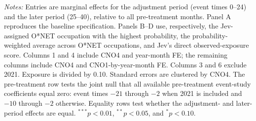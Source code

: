 \begin{table}[H]
\begin{threeparttable}
\begin{minipage}{0.92\textwidth}
\emph{Notes:} Entries are marginal effects for the adjustment period (event times 0--24) and the later period (25--40), relative to all pre-treatment months. Panel A reproduces the baseline specification. Panels B--D use, respectively, the Jev-assigned O*NET occupation with the highest probability, the probability-weighted average across O*NET occupations, and Jev's direct observed-exposure score. Columns 1 and 4 include CNO4 and year-month FE; the remaining columns include CNO4 and CNO1-by-year-month FE. Columns 3 and 6 exclude 2021. Exposure is divided by 0.10. Standard errors are clustered by CNO4. The pre-treatment row tests the joint null that all available pre-treatment event-study coefficients equal zero: event times $-21$ through $-2$ when 2021 is included and $-10$ through $-2$ otherwise. Equality rows test whether the adjustment- and later-period effects are equal. $^{***}p<0.01$, $^{**}p<0.05$, and $^{*}p<0.10$.
\end{minipage}
\end{threeparttable}
\end{table}

